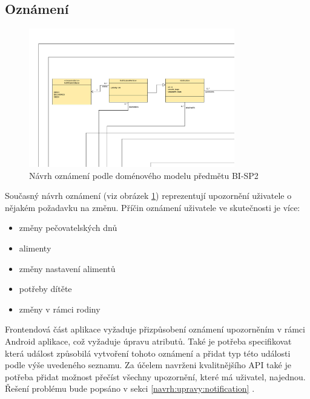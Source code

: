          \subsection{Oznámení}
            \begin{figure}\centering
	            \includegraphics[width=0.8\textwidth]{pdfs/Notification1}
	            \caption[Předchozí návrh oznámení]{Návrh oznámení podle doménového modelu předmětu BI-SP2}\label{image:notification1}
            \end{figure}
            Současný návrh oznámení (viz obrázek \ref{image:notification1}) reprezentují upozornění uživatele o nějakém požadavku na změnu. Příčin oznámení uživatele ve skutečnosti je více:
            \begin{itemize}
                \item změny pečovatelských dnů
                \item alimenty
                \item změny nastavení alimentů
                \item potřeby dítěte
                \item změny v rámci rodiny
            \end{itemize}
            Frontendová část aplikace vyžaduje přizpůsobení oznámení upozorněním v rámci Android aplikace, což vyžaduje úpravu atributů. Také je potřeba specifikovat která událost způsobilá vytvoření tohoto oznámení a přidat typ této události podle výše uvedeného seznamu. Za účelem navrženi kvalitnějšího API také je potřeba přidat možnost přečíst všechny upozornění, které má uživatel, najednou. Řešení problému bude popsáno v sekci \ref{navrh:upravy:notification} . 
            
            
